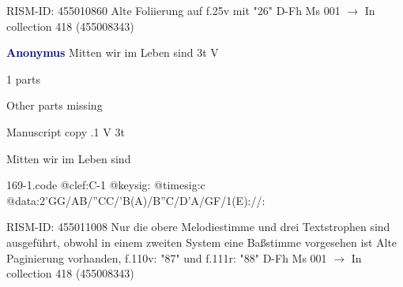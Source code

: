 \documentclass[twocolumn]{book}
\begin{document}
\newline RISM-ID: 455010860
\newline Alte Foliierung auf f.25v mit "26"
\newline D-Fh  Ms 001
\newline $\rightarrow$ In collection 418 (455008343)

\newline \par \vspace{7pt} \textcolor{darkblue}{\textbf{Anonymus  }}
\newline Mitten wir im Leben sind  3t  
\newline V
\newline \begin{itshape}\end{itshape} 
\newline \textcolor{darkblue}{}  1 parts  
\newline \begin{small} Other parts missing\end{small} 
\newline Manuscript copy
.1  V  3t
\newline \begin{footnotesize} Mitten wir im Leben sind \end{footnotesize}  
\begin{filecontents*}{169-1.code}
@clef:C-1
@keysig:
@timesig:c
@data:2'GG/AB/''CC/'B(A)/B''C/D'A/GF/1(E)://:
\end{filecontents*}
\newline
%

\newline RISM-ID: 455011008
\newline Nur die obere Melodiestimme und drei Textstrophen sind ausgeführt, obwohl in einem zweiten System eine Baßstimme vorgesehen ist
\newline Alte Paginierung vorhanden, f.110v: "87" und f.111r: "88"
\newline D-Fh  Ms 001
\newline $\rightarrow$ In collection 418 (455008343)
\end{document}
